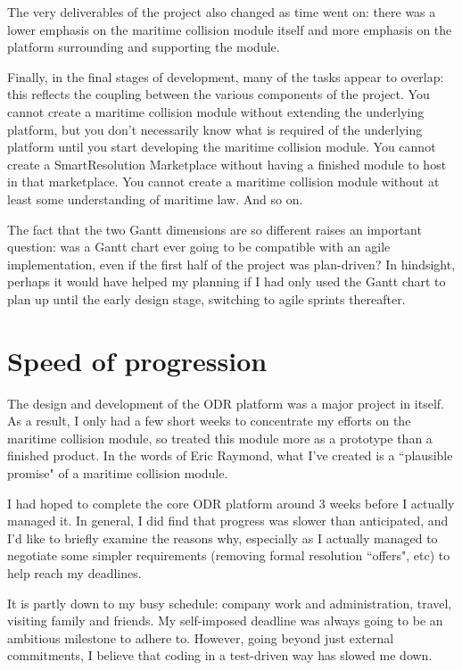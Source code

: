 The very deliverables of the project also changed as time went on: there was a lower emphasis on the maritime collision module itself and more emphasis on the platform surrounding and supporting the module.

Finally, in the final stages of development, many of the tasks appear to overlap: this reflects the coupling between the various components of the project. You cannot create a maritime collision module without extending the underlying platform, but you don't necessarily know what is required of the underlying platform until you start developing the maritime collision module. You cannot create a SmartResolution Marketplace without having a finished module to host in that marketplace. You cannot create a maritime collision module without at least some understanding of maritime law. And so on.

The fact that the two Gantt dimensions are so different raises an important question: was a Gantt chart ever going to be compatible with an agile implementation, even if the first half of the project was plan-driven? In hindsight, perhaps it would have helped my planning if I had only used the Gantt chart to plan up until the early design stage, switching to agile sprints thereafter.

\section{Speed of progression}

The design and development of the ODR platform was a major project in itself. As a result, I only had a few short weeks to concentrate my efforts on the maritime collision module, so treated this module more as a prototype than a finished product. In the words of Eric Raymond, what I've created is a ``plausible promise" of a maritime collision module.~\cite{eric:catB}

I had hoped to complete the core ODR platform around 3 weeks before I actually managed it. In general, I did find that progress was slower than anticipated, and I'd like to briefly examine the reasons why, especially as I actually managed to negotiate some simpler requirements (removing formal resolution ``offers", etc) to help reach my deadlines.

It is partly down to my busy schedule: company work and administration, travel, visiting family and friends. My self-imposed deadline was always going to be an ambitious milestone to adhere to. However, going beyond just external commitments, I believe that coding in a test-driven way has slowed me down.

